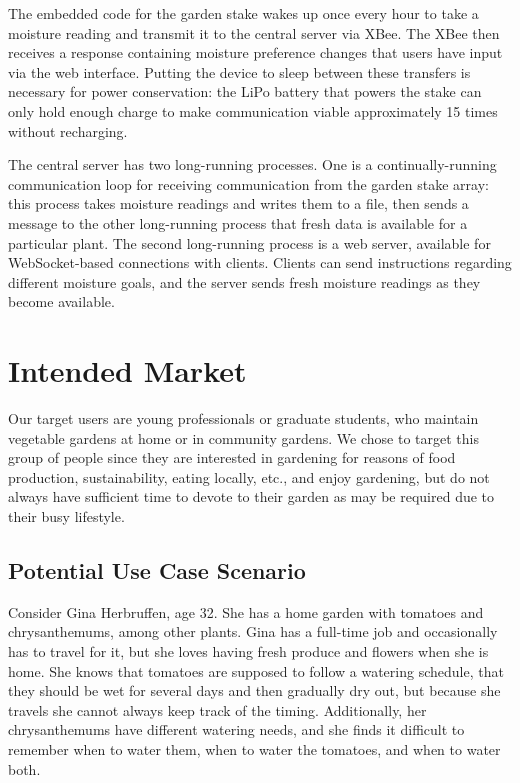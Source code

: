 \documentclass[11pt]{article}
\begin{document}
The embedded code for the garden stake wakes up once every hour to take a moisture reading and transmit it to the central server via XBee.  The XBee then receives a response containing moisture preference changes that users have input via the web interface.  Putting the device to sleep between these transfers is necessary for power conservation: the LiPo battery that powers the stake can only hold enough charge to make communication viable approximately 15 times without recharging.

The central server has two long-running processes.  One is a continually-running communication loop for receiving communication from the garden stake array: this process takes moisture readings and writes them to a file, then sends a message to the other long-running process that fresh data is available for a particular plant.  The second long-running process is a web server, available for WebSocket-based connections with clients.  Clients can send instructions regarding different moisture goals, and the server sends fresh moisture readings as they become available.

\section{Intended Market}

Our target users are young professionals or graduate students, who maintain vegetable gardens at home or in community gardens. We chose to target this group of people since they are interested in gardening for reasons of food production, sustainability, eating locally, etc., and enjoy gardening, but do not always have sufficient time to devote to their garden as may be required due to their busy lifestyle.

\subsection{Potential Use Case Scenario}
Consider Gina Herbruffen, age 32.  She has a home garden with tomatoes and chrysanthemums, among other plants.  Gina has a full-time job and occasionally has to travel for it, but she loves having fresh produce and flowers when she is home.  She knows that tomatoes are supposed to follow a watering schedule, that they should be wet for several days and then gradually dry out, but because she travels she cannot always keep track of the timing.  Additionally, her chrysanthemums have different watering needs, and she finds it difficult to remember when to water them, when to water the tomatoes, and when to water both.
\end{document}
